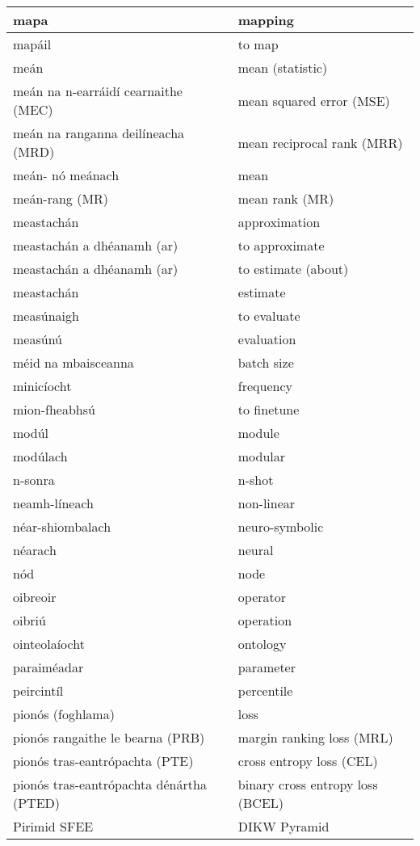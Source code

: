 \documentclass{article}
\begin{document}
\begin{longtable}{|l|l|}
		mapa&mapping\\ \hline 
		mapáil&to map\\ \hline 
		meán&mean (statistic)\\ \hline 
		meán na n-earráidí cearnaithe (MEC)&mean squared error (MSE)\\ \hline 
		meán na ranganna deilíneacha (MRD)&mean reciprocal rank (MRR)\\ \hline 
		meán- nó meánach&mean\\ \hline 
		meán-rang (MR)&mean rank (MR)\\ \hline 
		meastachán&approximation\\ \hline 
		meastachán a dhéanamh (ar)&to approximate\\ \hline 
		meastachán a dhéanamh (ar)&to estimate (about)\\ \hline 
		meastachán&estimate\\ \hline 
		measúnaigh&to evaluate\\ \hline 
		measúnú&evaluation\\ \hline 
		méid na mbaisceanna&batch size\\ \hline 
		minicíocht&frequency\\ \hline 
		mion-fheabhsú&to finetune\\ \hline 
		modúl&module\\ \hline 
		modúlach&modular\\ \hline 
		n-sonra&n-shot\\ \hline 
		neamh-líneach&non-linear\\ \hline 
		néar-shiombalach&neuro-symbolic\\ \hline 
		néarach&neural\\ \hline 
		nód&node\\ \hline 
		oibreoir&operator\\ \hline 
		oibriú&operation\\ \hline 
		ointeolaíocht&ontology\\ \hline 
		paraiméadar&parameter\\ \hline 
		peircintíl&percentile\\ \hline 
		pionós (foghlama)&loss\\ \hline 
		pionós rangaithe le bearna (PRB)&margin ranking loss (MRL)\\ \hline 
		pionós tras-eantrópachta (PTE)&cross entropy loss (CEL)\\ \hline 
		pionós tras-eantrópachta dénártha (PTED)&binary cross entropy loss (BCEL)\\ \hline 
		Pirimid SFEE&DIKW Pyramid\\ \hline 

\end{longtable}
\end{document}
